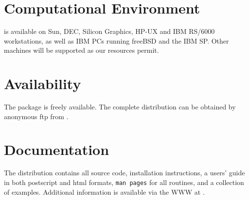 \section*{Computational Environment}
 is available on Sun, DEC, Silicon Graphics, HP-UX and IBM
RS/6000 workstations, as well as IBM PCs running freeBSD and the
IBM SP. Other machines will be supported as our resources permit.

\section*{Availability}

The  package is freely available.
The complete distribution can be obtained by anonymous ftp from 
.

\section*{Documentation}

The  distribution contains all source code, 
installation instructions,
a users' guide in both postscript and html formats, 
{\tt man pages} for all routines,
and a collection of examples.
Additional information is available via the WWW at
.

\makeinfo

